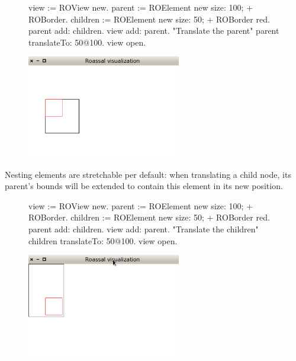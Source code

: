 \documentclass[a4paper,10pt,twoside]{book}
\begin{document}
\begin{figure}[H]
      \begin{minipage}[t]{0.5\textwidth}
      \vspace{0pt}
\begin{code}{}
view := ROView new.
parent := ROElement new 
				size: 100;
				+ ROBorder.
children := ROElement new 
				size: 50;
				+ ROBorder red.
parent add: children.
view add: parent.
"Translate the parent"
parent translateTo: 50@100.
view open.
\end{code}
   \end{minipage}
   \hfill
   \begin{minipage}[t]{0.6\textwidth}
      \vspace{0pt} \raggedright
       \centering
		\includegraphics[width=0.6\textwidth]{ex5}
   \end{minipage}
\label{fig:ex5}
\end{figure}

Nesting elements are stretchable per default: when translating a child node, its parent's bounds will be extended to contain this element in its new position. 

\begin{figure}[H]
      \begin{minipage}[t]{0.5\textwidth}
      \vspace{0pt}
\begin{code}{}
view := ROView new.
parent := ROElement new 
				size: 100;
				+ ROBorder.
children := ROElement new 
				size: 50;
				+ ROBorder red.
parent add: children.
view add: parent.
"Translate the children"
children translateTo: 50@100.
view open.
\end{code}
   \end{minipage}
   \hfill
   \begin{minipage}[t]{0.6\textwidth}
      \vspace{0pt} \raggedright
       \centering
		\includegraphics[width=0.6\textwidth]{ex6}
   \end{minipage}
\label{fig:ex6}
\end{figure}
\end{document}
